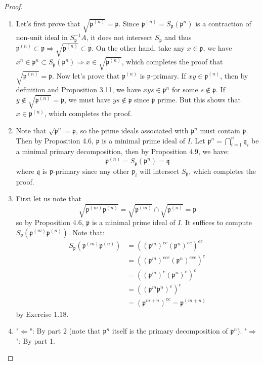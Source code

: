 \documentclass{solution}
\begin{document}
\begin{proof}
    \begin{enumerate}
        \item Let's first prove that $\sqrt{\mathfrak{p}^{(n)}} = \mathfrak{p}$. Since $\mathfrak{p}^{(n)} = S_{\mathfrak{p}}(\mathfrak{p}^n)$ is a contraction of non-unit ideal in $S_{\mathfrak{p}} ^{-1}A$, it does not intersect $S_{\mathfrak{p}}$ and thus $\mathfrak{p}^{(n)} \subset \mathfrak{p} \Rightarrow \sqrt{\mathfrak{p}^{(n)}} \subset \mathfrak{p}$. On the other hand, take any $x \in \mathfrak{p}$, we have $x^n \in \mathfrak{p}^n \subset S_{\mathfrak{p}}(\mathfrak{p}^n) \Rightarrow x \in \sqrt{\mathfrak{p}^{(n)}}$, which completes the proof that $\sqrt{\mathfrak{p}^{(n)}} = \mathfrak{p}$. Now let's prove that $\mathfrak{p}^{(n)}$ is $\mathfrak{p}$-primary. If $xy \in \mathfrak{p}^{(n)}$, then by definition and Proposition 3.11, we have $xys \in \mathfrak{p}^n$ for some $s \notin \mathfrak{p}$. If $y \notin \sqrt{\mathfrak{p}^{(n)}} = \mathfrak{p}$, we must have $ys \notin \mathfrak{p}$ since $\mathfrak{p}$ prime. But this shows that $x \in \mathfrak{p}^{(n)}$, which completes the proof.
        \item Note that $\sqrt{\mathfrak{p}^n} = \mathfrak{p}$, so the prime ideals associated with $\mathfrak{p}^n$ must contain $\mathfrak{p}$. Then by Proposition 4.6, $\mathfrak{p}$ is a minimal prime ideal of $I$. Let $\mathfrak{p}^n = \bigcap\limits_{i = 1}^{n} \mathfrak{q}_i$ be a minimal primary decomposition, then by Proposition 4.9, we have:
        $$\mathfrak{p}^{(n)} = S_{\mathfrak{p}}(\mathfrak{p}^n) = \mathfrak{q}$$
        where $\mathfrak{q}$ is $\mathfrak{p}$-primary since any other $\mathfrak{p}_i$ will intersect $S_{\mathfrak{p}}$, which completes the proof.
        \item First let us note that
        $$\sqrt{\mathfrak{p}^{(m)} \mathfrak{p}^{(n)}} = \sqrt{\mathfrak{p}^{(m)}} \cap \sqrt{\mathfrak{p}^{(n)}} = \mathfrak{p}$$
        so by Proposition 4.6, $\mathfrak{p}$ is a minimal prime ideal of $I$. It suffices to compute $S_{\mathfrak{p}} (\mathfrak{p}^{(m)} \mathfrak{p}^{(n)})$. Note that:
        $$
            \begin{aligned}
            S_\mathfrak{p}(\mathfrak{p}^{(m)}\mathfrak{p}^{(n)}) &= \left(\left(\mathfrak{p}^m\right)^{ec} \left(\mathfrak{p}^n\right)^{ec}\right)^{ec} \\
            &= \left(\left(\mathfrak{p}^m\right)^{ece} \left(\mathfrak{p}^n\right)^{ece}\right)^{c} \\
            &= \left(\left(\mathfrak{p}^m\right)^{e} \left(\mathfrak{p}^n\right)^{e}\right)^{c} \\
            &= \left(\left(\mathfrak{p}^m \mathfrak{p}^n\right)^{e}\right)^{c} \\
            &= \left(\mathfrak{p}^{m + n}\right)^{ec} = \mathfrak{p}^{(m + n)}
            \end{aligned}
        $$
        by Exercise 1.18.
        \item "$\Leftarrow$": By part 2 (note that $\mathfrak{p}^n$ itself is the primary decomposition of $\mathfrak{p}^n$). "$\Rightarrow$": By part 1.
    \end{enumerate}
\end{proof}
\end{document}
